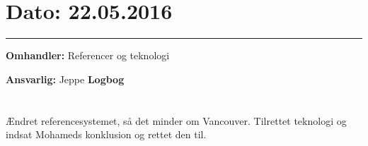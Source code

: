 

\section{Dato: 22.05.2016}
\hrule

\textbf{Omhandler:} Referencer og teknologi

\textbf{Ansvarlig:} Jeppe 
\textbf{Logbog}
\\
\\ \\
Ændret referencesystemet, så det minder om Vancouver. Tilrettet teknologi og indsat Mohameds konklusion og rettet den til.
